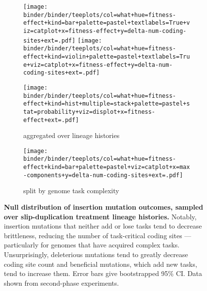 \begin{figure*}
    \centering
    \begin{subfigure}{\textwidth}
    \texttt{[image: binder/binder/teeplots/col=what+hue=fitness-effect+kind=bar+palette=pastel+textlabels=True+viz=catplot+x=fitness-effect+y=delta-num-coding-sites+ext=.pdf]}%
    \texttt{[image: binder/binder/teeplots/col=what+hue=fitness-effect+kind=violin+palette=pastel+textlabels=True+viz=catplot+x=fitness-effect+y=delta-num-coding-sites+ext=.pdf]}

    \texttt{[image: binder/binder/teeplots/col=what+hue=fitness-effect+kind=hist+multiple=stack+palette=pastel+stat=probability+viz=displot+x=fitness-effect+ext=.pdf]}

    \caption{\footnotesize aggregated over lineage histories}
    \end{subfigure}

    \begin{subfigure}{\textwidth}
    \centering
\texttt{[image: binder/binder/teeplots/col=what+hue=fitness-effect+kind=bar+palette=pastel+viz=catplot+x=max-components+y=delta-num-coding-sites+ext=.pdf]}
    \caption{\footnotesize split by genome task complexity}
    \end{subfigure}
    \caption{
        \textbf{Null distribution of insertion mutation outcomes, sampled over slip-duplication treatment lineage histories.}
        \footnotesize
        Notably, insertion mutations that neither add or lose tasks tend to decrease brittleness, reducing the number of task-critical coding sites --- particularly for genomes that have acquired complex tasks.
        Unsurprisingly, deleterious mutations tend to greatly decrease coding site count and beneficial mutations, which add new tasks, tend to increase them.
        Error bars give bootstrapped 95\% CI.
        Data shown from second-phase experiments.
    }
    \label{fig:nulldist}
\end{figure*}
